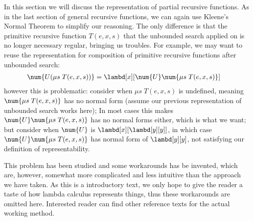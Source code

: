 \documentclass[../../../include/open-logic-section]{subfiles}
\begin{document}

In this section we will discuss the representation of partial
recursive functions. As in the last section of general recursive
functions, we can again use Kleene's Normal Theorem to simplify our
reasoning. The only difference is that the primitive recursive
function $T(e,x,s)$ that the unbounded search applied on is no longer
necessary regular, bringing us troubles. For example, we may want to
reuse the representation for composition of primitive recursive
functions after unbounded search:
\begin{align*}
  \num{U(\mu s \; T(e,x,s))} &= \lambd[x][\num{U} \num{\mu s \; T(e,x,s)}]
\end{align*}
however this is problematic: consider when $\mu s \; T(e,x,s)$ is
undefined, meaning $\num{\mu s \; T(e,x,s)}$ has no normal
form (assume our previous representation of unbounded search works
here); In most cases this makes $\num{U} \num{\mu s \; T(e,x,s)}$ has
no normal forms either, which is what we want; but consider when
$\num{U}$ is $\lambd[x][\lambd[y][y]]$, in which case $\num{U}
\num{\mu s \; T(e,x,s)}$ has normal form of $\lambd[y][y]$, not
satisfying our definition of representability.

This problem has been studied and some workarounds has be invented, 
which are, however, somewhat more complicated and less intuitive than the
approach we have taken. As this is a introductory text, we only hope to
give the reader a taste of how lambda calculus represents things, thus
these workarounds are omitted here. Interested reader can find other
reference texts for the actual working method.
\end{document}
